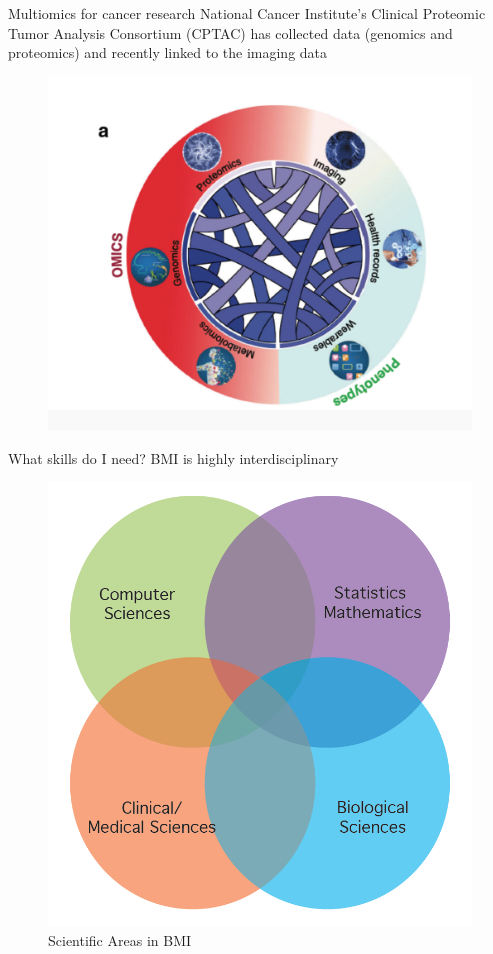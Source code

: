 \documentclass[11pt, aspectratio=43]{beamer}
\begin{document}
	
	\begin{frame}{Multiomics for cancer research }
		National Cancer Institute’s Clinical Proteomic Tumor Analysis Consortium
		(CPTAC) has collected data (genomics and proteomics) and recently linked
		to the imaging data
		\begin{figure}[h]
			\centering
			\includegraphics[scale=0.45]{Figures/multiomics.png}
		\end{figure}
	\end{frame}
	
	\begin{frame}{What skills do I need?}
		BMI is highly interdisciplinary 
		\begin{figure}[h]
			\centering
			\includegraphics[scale=0.45]{Figures/venn.png}
			\caption{Scientific Areas in BMI}
		\end{figure}
		
	\end{frame}
	
\end{document}
